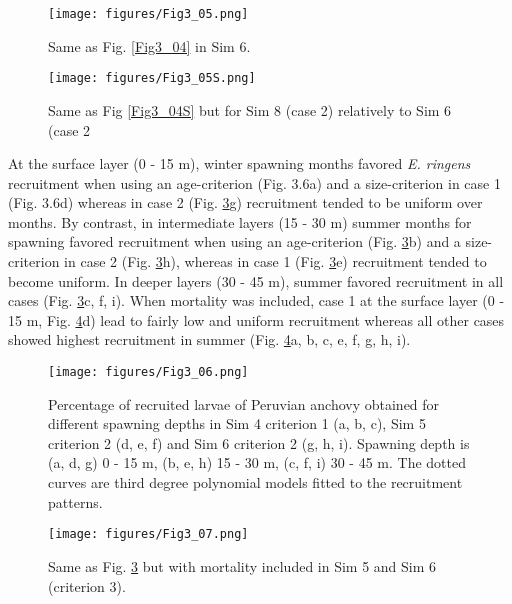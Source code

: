 \begin{figure}[ht]
	\texttt{[image: figures/Fig3\_05.png]}
	\centering
	\caption{Same as Fig. \ref{Fig3_04} in Sim 6.}
	\label{Fig3_05}
\end{figure}

\begin{figure}[ht]
	\texttt{[image: figures/Fig3\_05S.png]}
	\centering
	\caption{Same as Fig \ref{Fig3_04S} but for Sim 8 (case 2) relatively to Sim 6 (case 2}
	\label{Fig3_05S}
\end{figure}

At the surface layer (0 - 15 m), winter spawning months favored \textit{E. ringens} recruitment when using an age-criterion (Fig. 3.6a) and a size-criterion in case 1 (Fig. 3.6d) whereas in case 2 (Fig. \ref{Fig3_06}g) recruitment tended to be uniform over months. By contrast, in intermediate layers (15 - 30 m) summer months for spawning favored recruitment when using an age-criterion (Fig. \ref{Fig3_06}b) and a size-criterion in case 2 (Fig. \ref{Fig3_06}h), whereas in case 1 (Fig. \ref{Fig3_06}e) recruitment tended to become uniform. In deeper layers (30 - 45 m), summer favored recruitment in all cases (Fig. \ref{Fig3_06}c, f, i). When mortality was included, case 1 at the surface layer (0 - 15 m, Fig. \ref{Fig3_07}d) lead to fairly low and uniform recruitment whereas all other cases showed highest recruitment in summer (Fig. \ref{Fig3_07}a, b, c, e, f, g, h, i).\\

\begin{figure}[ht]
	\texttt{[image: figures/Fig3\_06.png]}
	\centering
	\caption{Percentage of recruited larvae of Peruvian anchovy obtained for different spawning depths in Sim 4 criterion 1 (a, b, c), Sim 5 criterion 2 (d, e, f) and Sim 6 criterion 2 (g, h, i). Spawning depth is (a, d, g) 0 - 15 m, (b, e, h) 15 - 30 m, (c, f, i) 30 - 45 m. The dotted curves are third degree polynomial models fitted to the recruitment patterns.}
	\label{Fig3_06}
\end{figure}

\begin{figure}[ht]
	\texttt{[image: figures/Fig3\_07.png]}
	\centering
	\caption{Same as Fig. \ref{Fig3_06} but with mortality included in Sim 5 and Sim 6 (criterion 3).}
	\label{Fig3_07}
\end{figure}

